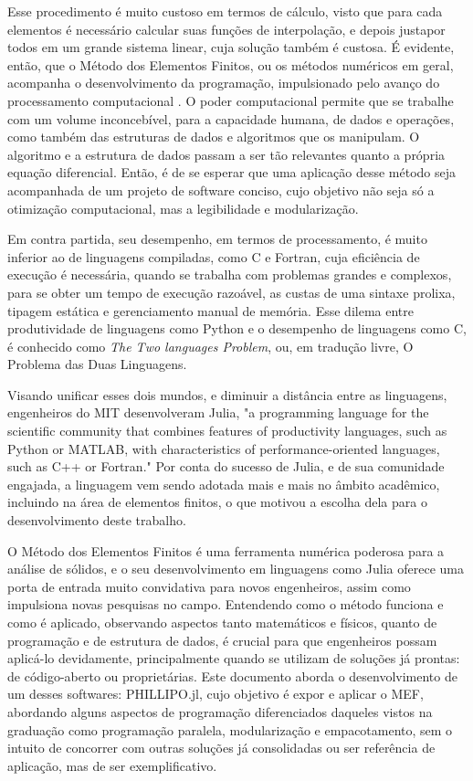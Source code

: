 Esse procedimento é muito custoso em termos de cálculo, visto que para cada elementos é necessário calcular suas funções de interpolação, e depois justapor todos em um grande sistema linear, cuja solução também é custosa. É evidente, então, que o Método dos Elementos Finitos, ou os métodos numéricos em geral, acompanha o desenvolvimento da programação, impulsionado pelo avanço do processamento computacional \cite{Onate}. O poder computacional permite que se trabalhe com um volume inconcebível, para a capacidade humana, de dados e operações, como também das estruturas de dados e algoritmos que os manipulam. O algoritmo e a estrutura de dados passam a ser tão relevantes quanto a própria equação diferencial. Então, é de se esperar que uma aplicação desse método seja acompanhada de um projeto de software conciso, cujo objetivo não seja só a otimização computacional, mas a legibilidade e modularização.

Em contra partida, seu desempenho, em termos de processamento, é muito inferior ao de linguagens compiladas, como C e Fortran, cuja eficiência de execução é necessária, quando se trabalha com problemas grandes e complexos, para se obter um tempo de execução razoável, as custas de uma sintaxe prolixa, tipagem estática e gerenciamento manual de memória. Esse dilema entre produtividade de linguagens como Python e o desempenho de linguagens como C, é conhecido como \emph{The Two languages Problem}, ou, em tradução livre, O Problema das Duas Linguagens.

Visando unificar esses dois mundos, e diminuir a distância entre as linguagens, engenheiros do MIT desenvolveram Julia, "a programming language for the scientific community that combines features of productivity languages, such as Python or MATLAB, with characteristics of performance-oriented languages, such as C++ or Fortran." \cite[tradução livre]{Bezanson} Por conta do sucesso de Julia, e de sua comunidade engajada, a linguagem vem sendo adotada mais e mais no âmbito acadêmico, incluindo na área de elementos finitos, o que motivou a escolha dela para o desenvolvimento deste trabalho.

O Método dos Elementos Finitos é uma ferramenta numérica poderosa para a análise de sólidos, e o seu desenvolvimento em linguagens como Julia oferece uma porta de entrada muito convidativa para novos engenheiros, assim como impulsiona novas pesquisas no campo. Entendendo como o método funciona e como é aplicado, observando aspectos tanto matemáticos e físicos, quanto de programação e de estrutura de dados, é crucial para que engenheiros possam aplicá-lo devidamente, principalmente quando se utilizam de soluções já prontas: de código-aberto ou proprietárias. Este documento aborda o desenvolvimento de um desses softwares: PHILLIPO.jl, cujo objetivo é expor e aplicar o MEF, abordando alguns aspectos de programação diferenciados daqueles vistos na graduação como programação paralela, modularização e empacotamento, sem o intuito de concorrer com outras soluções já consolidadas ou ser referência de aplicação, mas de ser exemplificativo.

